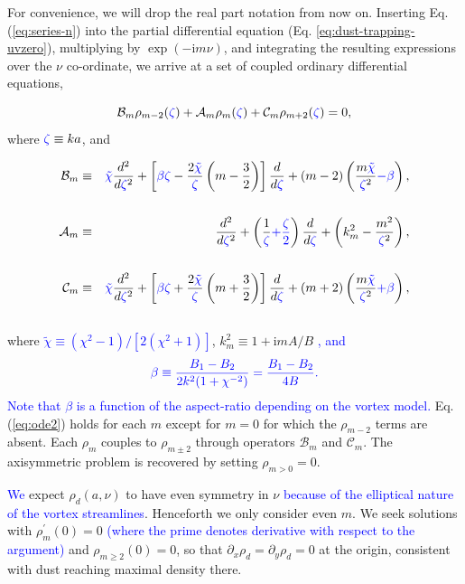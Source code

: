 \documentclass[apj]{emulateapj}
\def\blue#1{\textcolor{blue}{ #1}}
\newcommand{\Eq}[1]{Eq. (\ref{#1})}
\newcommand{\eq}[1]{\Eq{#1}}
\newcommand{\eqp}[1]{(Eq. \ref{#1})}
\newcommand{\beq}{\begin{equation}}
\newcommand{\eeq}{\end{equation}}
\newcommand{\beqn}{\begin{eqnarray}}
\newcommand{\eeqn}{\end{eqnarray}}
\newcommand{\tilchi}{\tilde\chi}
\begin{document}
For convenience, we will drop the real part notation from now on. Inserting
\eq{eq:series-n} into the partial differential equation \eqp{eq:dust-trapping-uvzero},
multiplying by $\exp{(-\mathrm{i}m\nu)}$, and integrating the resulting
expressions over the $\nu$ co-ordinate, we arrive at a set of coupled
ordinary differential equations, 

\blue{
\beq\label{eq:ode2}
\mathcal{B}_m\rho_{m-2} (\blue{\zeta})+ \mathcal{A}_m\rho_m(\blue{\zeta}) + \mathcal{C}_m\rho_{m+2}(\blue{\zeta}) = 0,
\eeq
}
where $\blue{\zeta}\equiv ka$, and

\beqn
\mathcal{B}_m &\equiv& \blue{\tilchi}\frac{d^2}{d\blue{\zeta}^2} + \left[\blue{\beta \blue{\zeta}}-
  \frac{2\blue{\tilchi}}{\blue{\zeta}}
  \left(m-\frac{3}{2}\right)\right]\frac{d}{d\blue{\zeta}}+\left(m-2\right)\left(\frac{m\blue{\tilchi}}{\blue{\zeta}^2}\blue{-\beta}\right), \notag\\
&&\label{eq:ops}\\ 
\mathcal{A}_m&\equiv&\frac{d^2}{d\blue{\zeta}^2} +\left(\frac{1}{\blue{\zeta}}\blue{+\frac{\blue{\zeta}}{2}}\right)\frac{d}{d\blue{\zeta}} +\left(k_m^2-\frac{m^2}{\blue{\zeta}^2}\right),\\
%
&&\notag\\
\mathcal{C}_m &\equiv& \blue{\tilchi}\frac{d^2}{d\blue{\zeta}^2}
+\left[\blue{\beta \blue{\zeta}} +
  \frac{2\blue{\tilchi}}{\blue{\zeta}}\left(m+\frac{3}{2}\right)\right]\frac{d}{d\blue{\zeta}}
+ \left(m+2\right)\left(\frac{m\blue{\tilchi}}{\blue{\zeta}^2}
  \blue{+\beta}\right),\notag\\
&&\label{eq:opsw}
\eeqn
where \blue{$\tilchi\equiv(\chi^2-1)/[2(\chi^2+1)]$}, $k_m^2 \equiv 1+\mathrm{i}mA/B$\blue{, and}
\beq
\blue{\beta \equiv \frac{B_1-B_2}{2k^2(1+\chi^{-2})} = \frac{B_1 - B_2}{4B}.}
\eeq
\blue{Note that $\beta$ is a function of the aspect-ratio depending on the vortex model.} 
\eq{eq:ode2} holds for each $m$ except for $m=0$ for which the $\rho_{m-2}$ terms are absent. Each 
$\rho_m$ couples to $\rho_{m\pm2}$ through operators $\mathcal{B}_m$
and $\mathcal{C}_m$. The axisymmetric problem is recovered by
setting $\rho_{m>0}=0$. 

\blue{We} expect $\rho_d(a,\nu)$ to have even symmetry in
$\nu$ \blue{because of the elliptical nature of the vortex streamlines}. 
Henceforth we only consider even $m$. We seek solutions with  
$\rho_m^\prime(0)=0$ \blue{(where the prime denotes derivative with respect to the argument)} and $\rho_{m\geq2}(0)=0$, so that
$\partial_x\rho_d=\partial_y\rho_d=0$ at the origin, consistent with 
dust reaching maximal density there.  
\end{document}
